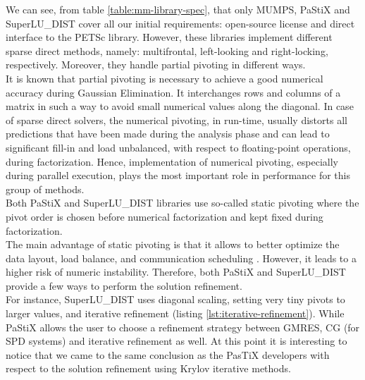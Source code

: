 


We can see, from table \ref{table:mm-library-spec}, that only MUMPS, PaStiX and SuperLU\_DIST cover all our initial requirements: open-source license and direct interface to the PETSc library. However, these libraries implement different sparse direct methods, namely: multifrontal, left-looking and right-locking, respectively. Moreover, they handle partial pivoting in different ways.\\


It is known that partial pivoting is necessary to achieve a good numerical accuracy during Gaussian Elimination. It interchanges rows and columns of a matrix in such a way to avoid small numerical values along the diagonal. In case of sparse direct solvers, the numerical pivoting, in run-time, usually distorts all predictions that have been made during the analysis phase and can lead to significant fill-in and load unbalanced, with respect to floating-point operations, during factorization. Hence, implementation of numerical pivoting, especially during parallel execution, plays the most important role in performance for this group of methods.\\


Both PaStiX and SuperLU\_DIST libraries use so-called static pivoting where the pivot order is chosen before numerical factorization and kept fixed during factorization.\\


The main advantage of static pivoting is that it allows to better optimize the data layout, load balance, and communication scheduling \cite{superlu-manual}. However, it leads to a higher risk of numeric instability. Therefore, both PaStiX and SuperLU\_DIST provide a few ways to perform the solution refinement.\\


For instance, SuperLU\_DIST uses diagonal scaling, setting very tiny pivots to larger values, and iterative refinement (listing \ref{lst:iterative-refinement}). While PaStiX allows the user to choose a refinement strategy between GMRES, CG (for SPD systems) and iterative refinement as well. At this point it is interesting to notice that we came to the same conclusion as the PasTiX developers with respect to the solution refinement using Krylov iterative methods.\\



